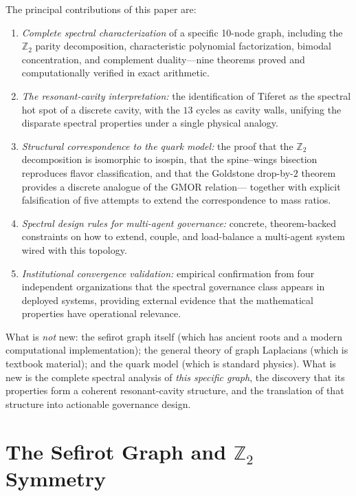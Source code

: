 \documentclass[11pt,a4paper]{amsart}
\theoremstyle{remark}
\newcommand{\bbZ}{\mathbb{Z}}
\begin{document}
The principal contributions of this paper are:

\begin{enumerate}[leftmargin=*,label=\arabic*.]
\item \emph{Complete spectral characterization} of a specific 10-node graph,
  including the $\bbZ_2$ parity decomposition, characteristic polynomial
  factorization, bimodal concentration, and complement duality---nine
  theorems proved and computationally verified in exact arithmetic.

\item \emph{The resonant-cavity interpretation:} the identification of
  Tiferet as the spectral hot spot of a discrete cavity, with the $13$
  cycles as cavity walls, unifying the disparate spectral properties under
  a single physical analogy.

\item \emph{Structural correspondence to the quark model:} the proof that
  the $\bbZ_2$ decomposition is isomorphic to isospin, that the spine--wings
  bisection reproduces flavor classification, and that the Goldstone
  drop-by-$2$ theorem provides a discrete analogue of the GMOR relation---
  together with explicit falsification of five attempts to extend the
  correspondence to mass ratios.

\item \emph{Spectral design rules for multi-agent governance:} concrete,
  theorem-backed constraints on how to extend, couple, and load-balance a
  multi-agent system wired with this topology.

\item \emph{Institutional convergence validation:} empirical confirmation
  from four independent organizations that the spectral governance class
  appears in deployed systems, providing external evidence that the
  mathematical properties have operational relevance.
\end{enumerate}

What is \emph{not} new: the sefirot graph itself (which has ancient roots
and a modern computational implementation); the general theory of graph
Laplacians (which is textbook material); and the quark model (which is
standard physics). What is new is the complete spectral analysis of
\emph{this specific graph}, the discovery that its properties form a
coherent resonant-cavity structure, and the translation of that structure
into actionable governance design.

\section{The Sefirot Graph and $\bbZ_2$ Symmetry}
\label{sec:z2-symmetry}
\end{document}
